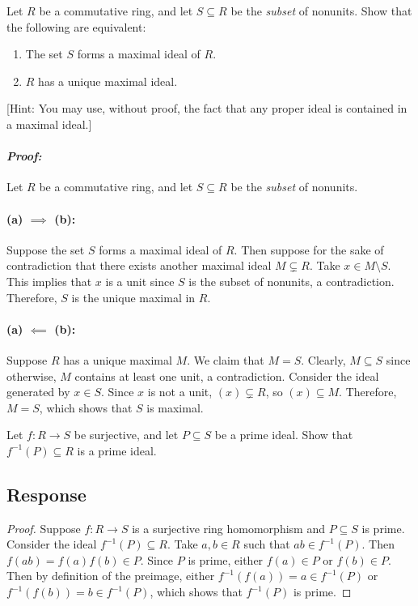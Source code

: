 \documentclass [12pt] {article}
\renewcommand{\it}[1]{\textit{{#1}}}
\newenvironment{problem}{\begin{tcolorbox}[title=Problem,colback=black!5!white,colframe=black!75!black]}{\end{tcolorbox}}
\newenvironment{response}{\begin{responseframe}\vspace{-10pt}\paragraph{\it{Proof:}}}{\end{responseframe}}
\begin{document}
\newpage
\begin{problem}
    Let $R$ be a commutative ring, and let $S\subseteq R$ be the \it{subset} of
    nonunits. Show that the following are equivalent:
    \begin{enumerate}[label=(\alph*)]
        \item The set $S$ forms a maximal ideal of $R$.
        \item $R$ has a unique maximal ideal.
    \end{enumerate}
    \vspace{1em}

    [Hint: You may use, without proof, the fact that any proper ideal is
    contained in a maximal ideal.]
\end{problem}
\begin{response}
    Let $R$ be a commutative ring, and let $S\subseteq R$ be the \it{subset} of
    nonunits.

    \paragraph{(a) $\bm{\implies}$ (b):} Suppose the set $S$ forms a maximal
    ideal of $R$. Then suppose for the sake of contradiction that there exists
    another maximal ideal $M\subsetneq R$. Take $x\in M\setminus S$. This
    implies that $x$ is a unit since $S$ is the subset of nonunits, a
    contradiction. Therefore, $S$ is the unique maximal in $R$.

    \paragraph{(a) $\bm{\impliedby}$ (b):} Suppose $R$ has a unique maximal $M$.
    We claim that $M=S$. Clearly, $M\subseteq S$ since otherwise, $M$ contains
    at least one unit, a contradiction. Consider the ideal generated by $x\in S$.
    Since $x$ is not a unit, $(x)\subsetneq R$, so $(x)\subseteq M$. Therefore,
    $M=S$, which shows that $S$ is maximal.
\end{response}

\newpage
\newcommand{\finv}{f^{-1}}
\begin{problem}
    Let $f:R\to S$ be surjective, and let $P\subseteq S$ be a prime ideal. Show
    that $f^{-1}(P)\subseteq R$ is a prime ideal.
\end{problem}
\subsection*{Response}
\begin{proof}
    Suppose $f : R\to S$ is a surjective ring homomorphism and $P\subseteq S$ is
    prime. Consider the ideal $\finv(P)\subseteq R$. Take $a,b\in R$ such that
    $ab\in \finv(P)$. Then $f(ab)=f(a)f(b)\in P$. Since $P$ is prime, either
    $f(a)\in P$ or $f(b)\in P$. Then by definition of the preimage, either
    $\finv(f(a))=a\in \finv(P)$ or $\finv(f(b))=b\in \finv(P)$, which shows that
    $\finv(P)$ is prime.
\end{proof}
\end{document}
